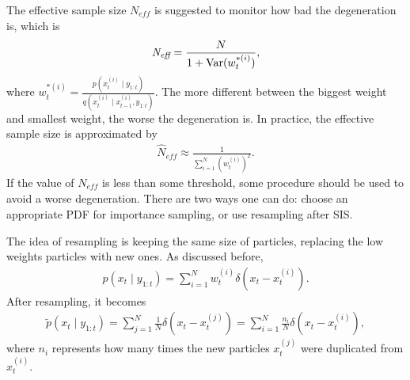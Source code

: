 The effective sample size $\textit{N}_{\textit{eff}}$ is suggested to monitor how bad the degeneration is, which is
\begin{align*}
\textit{N}_{\textit{eff}}=\frac{N}{1+\mathrm{Var}(w_t ^{*(i)})},
\end{align*}
where $w_t ^{*(i)}=\frac{p(x_t ^{(i)}\mid y_{1:t})}{q(x_t ^{(i)}\mid x_{t-1}^{(i)},y_{1:t})}$. The more different between the biggest weight and smallest weight, the worse the degeneration is. In practice, the effective sample size is approximated by
\begin{align*}
\hat{N}_{\textit{eff}}\approx \frac{1}{\sum_{i=1}^{N}(w_t ^{(i)})^2}.
\end{align*}
If the value of $\textit{N}_{\textit{eff}}$ is less than some threshold, some procedure should be used to avoid a worse degeneration. There are two ways one can do: choose an appropriate PDF for importance sampling, or use resampling after SIS. 

The idea of resampling is keeping the same size of particles, replacing the low weights particles with new ones. As discussed before, 
\begin{align*}
p(x_t \mid y_{1:t})=\sum_{i=1}^Nw_t ^{(i)} \delta (x_t -x_t ^{(i)}).
\end{align*}
After resampling, it becomes
\begin{align*}
\tilde{p}(x_t \mid y_{1:t})=\sum_{j=1}^N\frac{1}{N} \delta (x_t -x_t ^{(j)})= \sum_{i=1}^N\frac{n_i}{N} \delta (x_t -x_t ^{(i)}),
\end{align*}
where $n_i$ represents how many times the new particles $x_t ^{(j)}$ were duplicated from$x_t ^{(i)}$. 

